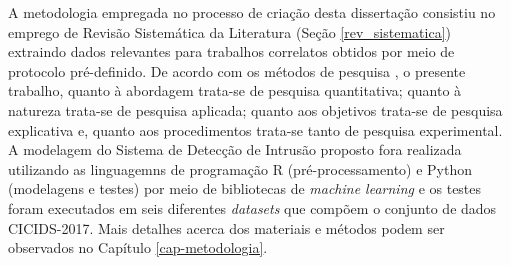A metodologia empregada no processo de criação desta dissertação consistiu no emprego de Revisão Sistemática da Literatura (Seção \ref{rev_sistematica}) extraindo dados relevantes para trabalhos correlatos obtidos por meio de protocolo pré-definido. De acordo com os métodos de pesquisa \cite{gerhardt2009metodos}, o presente trabalho, quanto à abordagem trata-se de pesquisa quantitativa; quanto à natureza trata-se de pesquisa aplicada; quanto aos objetivos trata-se de pesquisa explicativa e, quanto aos procedimentos trata-se tanto de pesquisa experimental. A modelagem do Sistema de Detecção de Intrusão proposto fora realizada utilizando as linguagemns de programação R (pré-processamento) e Python (modelagens e testes) por meio de bibliotecas de \textit{machine learning} e os testes foram executados em seis diferentes \textit{datasets} que compõem o conjunto de dados CICIDS-2017. Mais detalhes acerca dos materiais e métodos podem ser observados no Capítulo \ref{cap-metodologia}.
